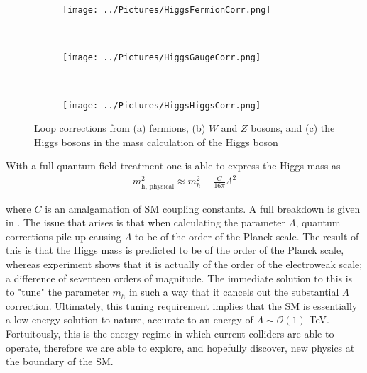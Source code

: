 \begin{figure}[H]
    \centering
    \begin{subfigure}[b]{0.33\textwidth}
        \centering
        \texttt{[image: ../Pictures/HiggsFermionCorr.png]}
        \caption{}
        \label{fig:FermionCorrection}
    \end{subfigure}
    ~
    \begin{subfigure}[b]{0.33\textwidth}
        \centering
        \texttt{[image: ../Pictures/HiggsGaugeCorr.png]}
	\caption{}
	\label{ref:BosonCorrection}
    \end{subfigure}
        ~
    \begin{subfigure}[b]{0.33\textwidth}
        \centering
        \texttt{[image: ../Pictures/HiggsHiggsCorr.png]}
        \caption{}
    \end{subfigure}
    \caption{Loop corrections from (a) fermions, (b) $W$ and $Z$ bosons, and (c) the Higgs bosons in the mass calculation of the Higgs boson}
    \label{fig:HiggsCorrections}
\end{figure}

\noindent With a full quantum field treatment one is able to express the Higgs mass as
\begin{align}
m_{\textrm{h, physical}}^{2} \approx m_{h}^{2} + \frac{C}{16 \pi} \Lambda^{2}
\end{align}

where $C$ is an amalgamation of SM coupling constants.
A full breakdown is given in \cite{baer2015supergravity}.
The issue that arises is that when calculating the parameter $\Lambda$, quantum corrections pile up causing $\Lambda$ to be of the order of the Planck scale.
The result of this is that the Higgs mass is predicted to be of the order of the Planck scale, whereas experiment shows that it is actually of the order of the electroweak scale; a difference of seventeen orders of magnitude.
The immediate solution to this is to "tune" the parameter $m_{h}$ in such a way that it cancels out the substantial $\Lambda$ correction.
Ultimately, this tuning requirement implies that the SM is essentially a low-energy solution to nature,  accurate to an energy of $\Lambda \sim \mathcal{O}(1)$ TeV.
Fortuitously, this is the energy regime in which current colliders are able to operate, therefore we are able to explore, and hopefully discover, new physics at the boundary of the SM.

